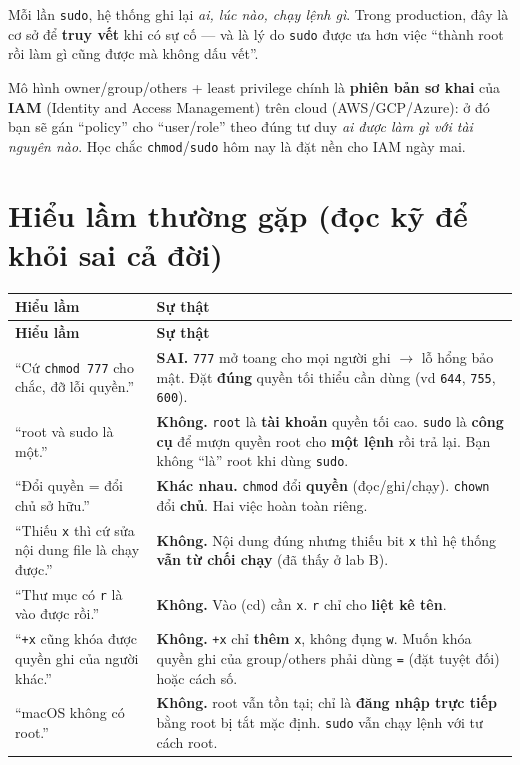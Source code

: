 \documentclass[12pt,a4paper]{article}
\newcommand{\cmd}[1]{\texttt{#1}}
\begin{document}
\begin{seniorbox}
Mỗi lần \cmd{sudo}, hệ thống ghi lại \textit{ai, lúc nào, chạy lệnh gì}. Trong
production, đây là cơ sở để \textbf{truy vết} khi có sự cố --- và là lý do \cmd{sudo}
được ưa hơn việc ``thành root rồi làm gì cũng được mà không dấu vết''.
\end{seniorbox}

\begin{seniorbox}
Mô hình owner/group/others + least privilege chính là \textbf{phiên bản sơ khai} của
\textbf{IAM} (Identity and Access Management) trên cloud (AWS/GCP/Azure): ở đó bạn sẽ
gán ``policy'' cho ``user/role'' theo đúng tư duy \textit{ai được làm gì với tài
nguyên nào}. Học chắc \cmd{chmod}/\cmd{sudo} hôm nay là đặt nền cho IAM ngày mai.
\end{seniorbox}

\section{Hiểu lầm thường gặp (đọc kỹ để khỏi sai cả đời)}

\begin{longtable}{|>{\raggedright\arraybackslash}p{5.5cm}|>{\raggedright\arraybackslash}p{8cm}|}
\hline
\rowcolor{tablehead}\textbf{Hiểu lầm} & \textbf{Sự thật} \\
\hline
\endfirsthead
\hline
\rowcolor{tablehead}\textbf{Hiểu lầm} & \textbf{Sự thật} \\
\hline
\endhead
``Cứ \cmd{chmod 777} cho chắc, đỡ lỗi quyền.'' & \textbf{SAI.} \cmd{777} mở toang
cho mọi người ghi $\rightarrow$ lỗ hổng bảo mật. Đặt \textbf{đúng} quyền tối thiểu cần dùng (vd
\cmd{644}, \cmd{755}, \cmd{600}). \\
\hline
``root và sudo là một.'' & \textbf{Không.} \cmd{root} là \textbf{tài khoản} quyền
tối cao. \cmd{sudo} là \textbf{công cụ} để mượn quyền root cho \textbf{một lệnh} rồi
trả lại. Bạn không ``là'' root khi dùng \cmd{sudo}. \\
\hline
``Đổi quyền = đổi chủ sở hữu.'' & \textbf{Khác nhau.} \cmd{chmod} đổi
\textbf{quyền} (đọc/ghi/chạy). \cmd{chown} đổi \textbf{chủ}. Hai việc hoàn toàn
riêng. \\
\hline
``Thiếu \cmd{x} thì cứ sửa nội dung file là chạy được.'' & \textbf{Không.} Nội dung
đúng nhưng thiếu bit \cmd{x} thì hệ thống \textbf{vẫn từ chối chạy} (đã thấy ở lab
B). \\
\hline
``Thư mục có \cmd{r} là vào được rồi.'' & \textbf{Không.} Vào (cd) cần \cmd{x}.
\cmd{r} chỉ cho \textbf{liệt kê tên}. \\
\hline
``\cmd{+x} cũng khóa được quyền ghi của người khác.'' & \textbf{Không.} \cmd{+x} chỉ
\textbf{thêm} \cmd{x}, không đụng \cmd{w}. Muốn khóa quyền ghi của group/others phải
dùng \cmd{=} (đặt tuyệt đối) hoặc cách số. \\
\hline
``macOS không có root.'' & \textbf{Không.} root vẫn tồn tại; chỉ là \textbf{đăng
nhập trực tiếp} bằng root bị tắt mặc định. \cmd{sudo} vẫn chạy lệnh với tư cách
root. \\
\hline
\end{longtable}
\end{document}
